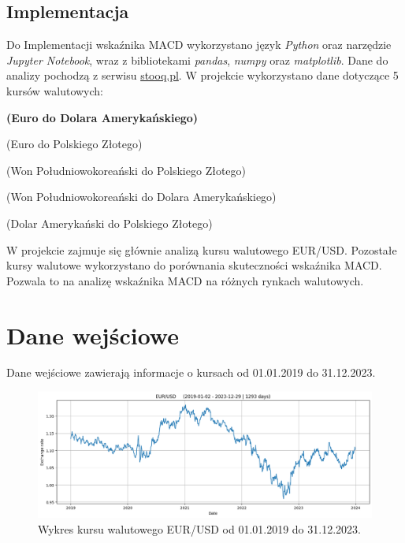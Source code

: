 \documentclass[12pt, a4paper]{article}
\begin{document}
\subsection{Implementacja}
Do Implementacji wskaźnika MACD wykorzystano język \textit{Python} oraz narzędzie 
\textit{Jupyter Notebook}, wraz z bibliotekami \textit{pandas}, \textit{numpy} oraz \textit{matplotlib}.
Dane do analizy pochodzą z serwisu \href{https://stooq.pl/}{stooq.pl}. 
W projekcie wykorzystano dane dotyczące 5 kursów walutowych:
\small
\begin{description}
    \setlength\itemsep{0.01em}
    \item[EUR/USD] \textbf{(Euro do Dolara Amerykańskiego)}
    \item[EUR/PLN] (Euro do Polskiego Złotego)
    \item[KRW/PLN] (Won Południowokoreański do Polskiego Złotego)
    \item[KRW/USD] (Won Południowokoreański do Dolara Amerykańskiego)
    \item[USD/PLN] (Dolar Amerykański do Polskiego Złotego)
\end{description}
\small
W projekcie zajmuje się głównie analizą kursu walutowego EUR/USD. Pozostałe kursy
walutowe wykorzystano do porównania skuteczności wskaźnika MACD.
Pozwala to na analizę wskaźnika MACD na różnych rynkach walutowych. 


\section{Dane wejściowe}

Dane wejściowe zawierają informacje o kursach od 01.01.2019 do 31.12.2023.

\begin{figure}[ht]
    \centering
    \includegraphics[width=1.0\textwidth]{eur_usd_value.png}
    \caption{Wykres kursu walutowego EUR/USD od 01.01.2019 do 31.12.2023.}
    \label{fig:eur_usd_value}
\end{figure}
\end{document}
